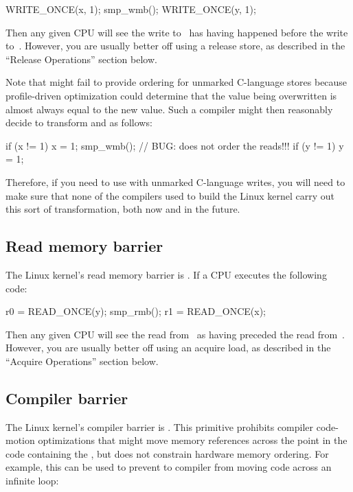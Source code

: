 \begin{VerbatimU}
	WRITE_ONCE(x, 1);
	smp_wmb();
	WRITE_ONCE(y, 1);
\end{VerbatimU}

Then any given CPU will see the write to~ has having happened before
the write to~.  However, you are usually better off using a release
store, as described in the ``Release Operations'' section below.

Note that  might fail to provide ordering for unmarked C-language
stores because profile-driven optimization could determine that the
value being overwritten is almost always equal to the new value.
Such a compiler might then reasonably decide to transform  and
 as follows:

\begin{VerbatimU}
	if (x != 1)
		x = 1;
	smp_wmb(); // BUG: does not order the reads!!!
	if (y != 1)
		y = 1;
\end{VerbatimU}

Therefore, if you need to use  with unmarked C-language writes,
you will need to make sure that none of the compilers used to build
the Linux kernel carry out this sort of transformation, both now and in
the future.


\subsection{Read memory barrier}

The Linux kernel's read memory barrier is .
If a CPU executes the following code:

\begin{VerbatimU}
	r0 = READ_ONCE(y);
	smp_rmb();
	r1 = READ_ONCE(x);
\end{VerbatimU}

Then any given CPU will see the read from~ as having preceded the read
from~.
However, you are usually better off using an acquire load, as described
in the ``Acquire Operations'' section below.

\subsection{Compiler barrier}

The Linux kernel's compiler barrier is .
This primitive prohibits compiler code-motion optimizations that might
move memory references across the point in the code containing the
, but does not constrain hardware memory ordering.
For example, this can be used to prevent to compiler from moving code
across an infinite loop:

